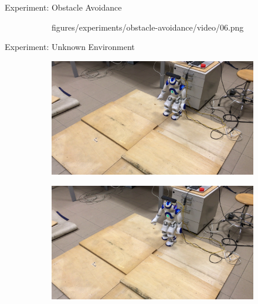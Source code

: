 \documentclass[10pt]{beamer}
\begin{document}
\begin{frame}{Experiment: Obstacle Avoidance}
\begin{figure}
\begin{subfigure}{0.40\textwidth}
				{figures/experiments/obstacle-avoidance/video/06.png}
		\end{subfigure}
	\end{figure}
\end{frame}

\begin{frame}{Experiment: Unknown Environment}
	\begin{figure}
		\begin{subfigure}{0.40\textwidth}
			\includegraphics[width=\linewidth]
				{figures/experiments/unknown-env/video/01.jpeg}
		\end{subfigure}\hspace{0.05cm}%
		\begin{subfigure}{0.40\textwidth}
			\includegraphics[width=\linewidth]
				{figures/experiments/unknown-env/video/02.jpeg}
		\end{subfigure}
		\begin{subfigure}{0.40\textwidth}

\end{subfigure}
\end{figure}
\end{frame}
\end{document}
